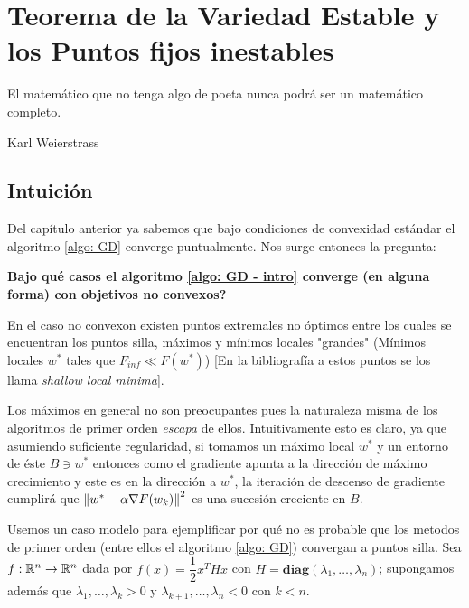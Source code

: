 \chapter{Teorema de la Variedad Estable y los Puntos fijos inestables}\label{ch:teorema-de-variedad-estable}

\epigraph{El matem\'atico que no tenga algo de poeta nunca podr\'a ser un matem\'atico completo.}{Karl Weierstrass}

\section{Intuici\'on}

Del cap\'itulo anterior ya sabemos que bajo condiciones de convexidad est\'andar el algoritmo \ref{algo: GD} converge puntualmente. Nos surge entonces la pregunta:

\medskip 

\textbf{Bajo qu\'e casos el algoritmo \ref{algo: GD - intro} converge (en alguna forma) con objetivos no convexos?}

\medskip

En el caso no convexon existen puntos extremales no \'optimos entre los cuales se encuentran los puntos silla, m\'aximos y m\'inimos locales "grandes" (\Eg  M\'inimos locales $w^*$ tales que $F_{inf} \ll F(w^*)$) [En la bibliograf\'ia a estos puntos se los llama \textit{shallow local minima}]. 

Los m\'aximos en general no son preocupantes pues la naturaleza misma de los algoritmos de primer orden \textit{escapa} de ellos. Intuitivamente esto es claro, ya que asumiendo suficiente regularidad, si tomamos un m\'aximo local $w^*$ y un entorno de \'este $B \ni w^*$ entonces como el gradiente apunta a la direcci\'on de m\'aximo crecimiento y este es en la direcci\'on a $w^*$, la iteraci\'on de descenso de gradiente cumplir\'a que  $ \left\lVert w^*-\alpha \nabla F(w_k)\right\rVert^2$ es una sucesi\'on creciente en $B$.

\bigskip
Usemos un caso modelo para ejemplificar por qu\'e no es probable que los metodos de primer orden (entre ellos el algoritmo \ref{algo: GD}) convergan a puntos silla. Sea $f: {\mathbb{R}}^n \rightarrow {\mathbb{R}}^n$ dada por $f(x) = \dfrac{1}{2} x^THx$ con $H = \textbf{diag}\left(\lambda_1, \dots, \lambda_n\right)$; supongamos adem\'as que $\lambda_1, \dots, \lambda_k > 0$ y $\lambda_{k+1}, \dots, \lambda_n <0$ con $k<n$.

